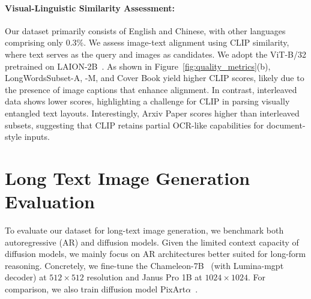 


% 




\paragraph{Visual-Linguistic Similarity Assessment:}
Our dataset primarily consists of English and Chinese, with other languages comprising only 0.3\%.
We assess image-text alignment using CLIP  similarity, where text serves as the query and images as candidates. 
We adopt the ViT-B/32 pretrained on LAION-2B~\cite{openclip}.
As shown in Figure~\ref{fig:quality_metrics}(b), LongWordsSubset-A, -M, and Cover Book yield higher CLIP scores, likely due to the presence of image captions that enhance alignment. 
In contrast, interleaved data shows lower scores, highlighting a challenge for CLIP in parsing visually entangled text layouts. 
Interestingly, Arxiv Paper scores higher than interleaved subsets, suggesting that CLIP retains partial OCR-like capabilities for document-style inputs.




\section{Long Text Image Generation Evaluation}



To evaluate our dataset for long-text image generation, we benchmark both autoregressive (AR) and diffusion models.
Given the limited context capacity of diffusion models, we mainly focus on AR architectures better suited for long-form reasoning.
Concretely, we fine-tune the Chameleon-7B~\cite{chameleon} (with Lumina-mgpt~\cite{lumina_mgpt} decoder) at $512\times512$ resolution and Janus Pro 1B at $1024\times1024$.
For comparison, we also train diffusion model PixArt$\alpha$~\cite{pixarta}.

